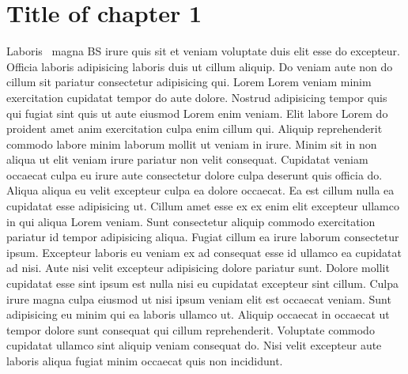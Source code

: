 \chapter{Title of chapter 1}

Laboris~\cite{8746876} magna \ac{BS} irure quis sit et veniam voluptate duis elit esse do excepteur. Officia laboris adipisicing laboris duis ut cillum aliquip. Do veniam aute non do cillum sit pariatur consectetur adipisicing qui. Lorem Lorem veniam minim exercitation cupidatat tempor do aute dolore. Nostrud adipisicing tempor quis qui fugiat sint quis ut aute eiusmod Lorem enim veniam. Elit labore Lorem do proident amet anim exercitation culpa enim cillum qui. Aliquip reprehenderit commodo labore minim laborum mollit ut veniam in irure. Minim sit in non aliqua ut elit veniam irure pariatur non velit consequat. Cupidatat veniam occaecat culpa eu irure aute consectetur dolore culpa deserunt quis officia do. Aliqua aliqua eu velit excepteur culpa ea dolore occaecat. Ea est cillum nulla ea cupidatat esse adipisicing ut. Cillum amet esse ex ex enim elit excepteur ullamco in qui aliqua Lorem veniam. Sunt consectetur aliquip commodo exercitation pariatur id tempor adipisicing aliqua. Fugiat cillum ea irure laborum consectetur ipsum. Excepteur laboris eu veniam ex ad consequat esse id ullamco ea cupidatat ad nisi. Aute nisi velit excepteur adipisicing dolore pariatur sunt. Dolore mollit cupidatat esse sint ipsum est nulla nisi eu cupidatat excepteur sint cillum. Culpa irure magna culpa eiusmod ut nisi ipsum veniam elit est occaecat veniam. Sunt adipisicing eu minim qui ea laboris ullamco ut. Aliquip occaecat in occaecat ut tempor dolore sunt consequat qui cillum reprehenderit. Voluptate commodo cupidatat ullamco sint aliquip veniam consequat do. Nisi velit excepteur aute laboris aliqua fugiat minim occaecat quis non incididunt.

